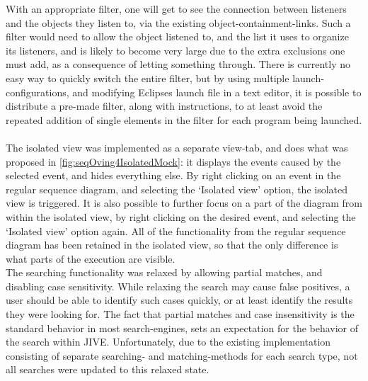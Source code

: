 With an appropriate filter, one will get to see the connection between listeners and the objects they listen to, via the existing object-containment-links.
Such a filter would need to allow the object listened to, and the list it uses to organize its listeners, and is likely to become very large due to the extra exclusions one must add, as a consequence of letting something through.
There is currently no easy way to quickly switch the entire filter, but by using multiple launch-configurations, and modifying Eclipses launch file in a text editor, it is possible to distribute a pre-made filter, along with instructions, to at least avoid the repeated addition of single elements in the filter for each program being launched.
~\\

The isolated view was implemented as a separate view-tab, and does what was proposed in \autoref{fig:seqOving4IsolatedMock}: it displays the events caused by the selected event, and hides everything else.
By right clicking on an event in the regular sequence diagram, and selecting the `Isolated view' option, the isolated view is triggered.%
It is also possible to further focus on a part of the diagram from within the isolated view, by right clicking on the desired event, and selecting the `Isolated view' option again.
All of the functionality from the regular sequence diagram has been retained in the isolated view, so that the only difference is what parts of the execution are visible.
~\\
 
The searching functionality was relaxed by allowing partial matches, and disabling case sensitivity.
While relaxing the search may cause false positives, a user should be able to identify such cases quickly, or at least identify the results they were looking for.
The fact that partial matches and case insensitivity is the standard behavior in most search-engines, sets an expectation for the behavior of the search within JIVE.
Unfortunately, due to the existing implementation consisting of separate searching- and matching-methods for each search type, not all searches were updated to this relaxed state.

